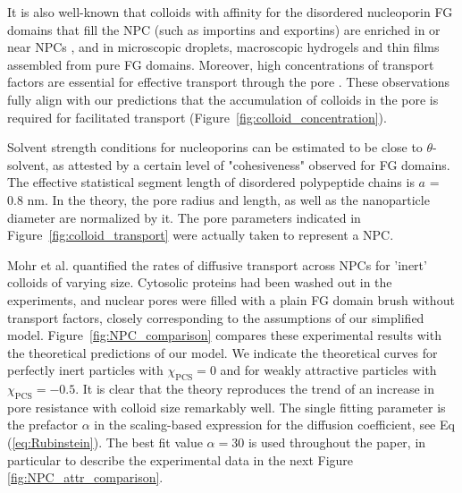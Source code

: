 \documentclass[12pt, a4paper]{article}
\begin{document}
It is also well-known that colloids with affinity for the disordered nucleoporin FG domains that fill the NPC (such as importins and exportins) are enriched in or near NPCs \cite{Beck2007, Gruenwald2010, Tu2011}, and in microscopic droplets, macroscopic hydrogels and thin films assembled from pure FG domains.
Moreover, high concentrations of transport factors are essential for effective transport through the pore \cite{Lowe2015}.
These observations fully align with our predictions that the accumulation of colloids in the pore is required for facilitated transport (Figure~\ref{fig:colloid_concentration}).

Solvent strength conditions for nucleoporins can be estimated to be close to $\theta$-solvent, as attested by a certain level of "cohesiveness" observed for FG domains. 
The effective statistical segment length of disordered polypeptide chains is $a$ = 0.8 nm. In the theory, the pore radius and length, as well as the nanoparticle diameter are normalized by it. The pore parameters indicated in Figure~\ref{fig:colloid_transport} were actually taken to represent a NPC.

Mohr et al. quantified the rates of diffusive transport across NPCs for 'inert' colloids of varying size. Cytosolic proteins had been washed out in the experiments, and nuclear pores were filled with a plain FG domain brush without transport factors, closely corresponding to the assumptions of our simplified model. Figure~\ref{fig:NPC_comparison} compares these experimental results with the theoretical predictions of our model. We indicate the theoretical curves for perfectly inert particles with $\chi_{\text{PCS}} = 0$ and for weakly attractive particles with $\chi_{\text{PCS}} = -0.5$. It is clear that the theory reproduces the trend of an increase in pore resistance with colloid size remarkably well. The single fitting parameter is the prefactor $\alpha$ in the scaling-based expression for the diffusion coefficient, see Eq (\ref{eq:Rubinstein}). The best fit value $\alpha=30$ is used throughout the paper, in particular to describe the experimental data in the next Figure \ref{fig:NPC_attr_comparison}.
\end{document}
